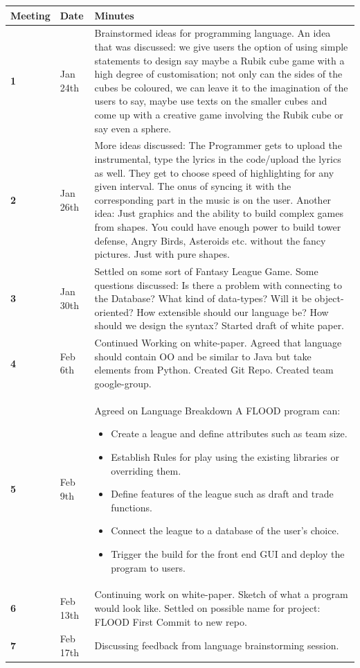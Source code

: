 \documentclass[12pt]{report}
\begin{document}
\begin{flushleft}
\begin{singlespace}
\begin{tabular}{ | p{2cm} | p{1.8cm} | p{12cm} | }
\hline
\textbf{Meeting} & \textbf{Date} & \textbf{Minutes}\\
\hline
\textbf{1} & Jan 24th & Brainstormed ideas for programming language. An idea that was discussed: we give users the option of using simple statements to design say maybe a Rubik cube game with a high degree of customisation; not only can the sides of the cubes be coloured, we can leave it to the imagination of the users to say, maybe use texts on the smaller cubes and come up with a creative game involving the Rubik cube or say even a sphere.\\
\hline
\textbf{2} & Jan 26th & More ideas discussed: The  Programmer gets to upload the instrumental, type the lyrics in the code/upload the lyrics as well. They get to choose speed of highlighting for any given interval. The onus of syncing it with the corresponding part in the music is on the user. Another idea:  Just graphics and the ability to build complex games from shapes. You could have enough power to build tower defense, Angry Birds, Asteroids etc. without the fancy pictures. Just with pure shapes.\\
\hline
\textbf{3} & Jan 30th & Settled on some sort of Fantasy League Game. Some questions discussed: Is there a problem with connecting to the Database? What kind of data-types? Will it be object-oriented? How extensible should our language be? How should we design the syntax? Started draft of white paper.\\
\hline
\textbf{4} & Feb 6th & Continued Working on white-paper. Agreed that language should contain OO and be similar to Java but take elements from Python. Created Git Repo. Created team google-group.\\
\hline
\textbf{5} & Feb 9th & Agreed on Language Breakdown
A FLOOD program can:
\begin{itemize}
\item Create a league and define attributes such as team size.
\item Establish Rules for play using the existing libraries or overriding them.
\item Define features of the league such as draft and trade functions.
\item Connect the league to a database of the user's choice.
\item Trigger the build for the front end GUI and deploy the program to users.
\end{itemize}\\
\hline
\textbf{6} & Feb 13th & Continuing work on white-paper. Sketch of what a program would look like. Settled on possible name for project: FLOOD
First Commit to new repo.\\
\hline
\textbf{7} & Feb 17th & Discussing feedback from language brainstorming session.\\
\hline
\end{tabular}
\end{singlespace}
\end{flushleft}
\end{document}
